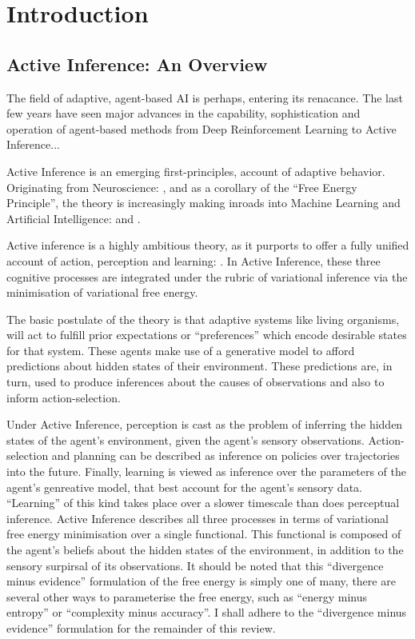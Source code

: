 \documentclass[onecolumn]{IEEEtran}
\begin{document}
\section{Introduction}

\subsection{Active Inference: An Overview}

The field of adaptive, agent-based AI is perhaps, entering its renacance. The last few years have seen major advances in the capability, sophistication and operation of agent-based methods from Deep Reinforcement Learning to Active Inference... 

Active Inference is an emerging first-principles, account of adaptive behavior. Originating from Neuroscience: \textcite{A_FEP_For_The_Brain}, \textcite{The-Bayesian-Brain} and \textcite{Action-Behaviour-FE} as a corollary of the ``Free Energy Principle'', the theory is increasingly making inroads into Machine Learning and Artificial Intelligence: \textcite{RL-or-AIF} and \textcite{Applications-of-FEP-Machine-Learning-Neuroscience}. 

Active inference is a highly ambitious theory, as it purports to offer a fully unified account of action, perception and learning: \textcite{FEP-Unified-Brain-Theory}. In Active Inference, these three cognitive processes are integrated under the rubric of variational inference via the minimisation of variational free energy. 

The basic postulate of the theory is that adaptive systems like living organisms, will act to fulfill prior expectations or ``preferences'' which encode desirable states for that system. These agents make use of a generative model to afford predictions about hidden states of their environment. These predictions are, in turn, used to produce inferences about the causes of observations and also to inform action-selection. 

Under Active Inference, perception is cast as the problem of inferring the hidden states of the agent's environment, given the agent's sensory observations. Action-selection and planning can be described as inference on policies over trajectories into the future. Finally, learning is viewed as inference over the parameters of the agent's genreative model, that best account for the agent's sensory data. ``Learning'' of this kind takes place over a slower timescale than does perceptual inference. Active Inference describes all three processes in terms of variational free energy minimisation over a single functional. This functional is composed of the agent's beliefs about the hidden states of the environment, in addition to the sensory surpirsal of its observations. It should be noted that this ``divergence minus evidence'' formulation of the free energy is simply one of many, there are several other ways to parameterise the free energy, such as ``energy minus entropy'' or ``complexity minus accuracy''. I shall adhere to the ``divergence minus evidence'' formulation for the remainder of this review. 
\end{document}
